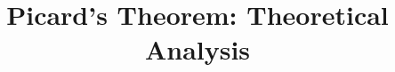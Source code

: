 \documentclass{beamer}
\title[Section 1.5]{Picard's Theorem: Theoretical Analysis}
\begin{document}
\begin{frame}
\titlepage
\end{frame}
\end{document}
